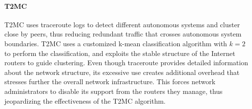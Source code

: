 \documentclass[acmcsur,acmnow]{acmtrans2m}
\begin{document}
\paragraph*{\bf T2MC}

T2MC \cite{shi_t2mc_2008} uses traceroute logs to detect different autonomous systems and
cluster close by peers, thus reducing redundant traffic that crosses autonomous system boundaries. T2MC uses a customized k-mean classification
algorithm with $k=2$ to perform the classification, and exploits the stable
structure of the Internet routers to guide clustering.
Even though traceroute provides detailed information about the network
structure, its excessive use creates additional overhead that stresses further the overall network infrastructure. This forces network administrators to disable its support from the routers they manage, thus jeopardizing the effectiveness of the T2MC algorithm. 

\end{document}
